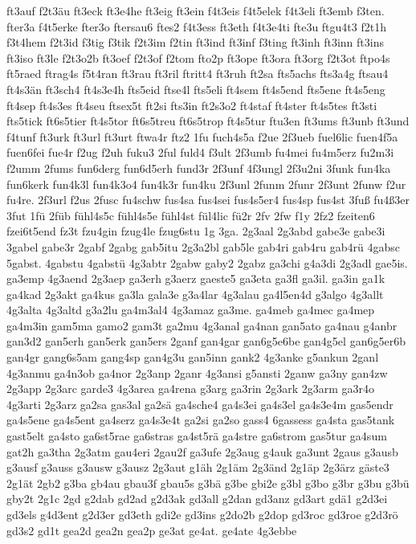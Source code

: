 {ft3auf
f2t3äu
ft3eck
ft3e4he
ft3eig
ft3ein
f4t3eis
f4t5elek
f4t3eli
ft3emb
f3ten.
fter3a
f4t5erke
fter3o
ftersau6
ftes2
f4t3ess
ft3eth
f4t3e4ti
fte3u
ftgu4t3
f2t1h
f3t4hem
f2t3id
f3tig
f3tik
f2t3im
f2tin
ft3ind
ft3inf
f3ting
ft3inh
ft3inn
ft3ins
ft3iso
ft3le
f2t3o2b
ft3oef
f2t3of
f2tom
fto2p
ft3ope
ft3ora
ft3org
f2t3ot
ftpo4s
ft5raed
ftrag4s
f5t4ran
ft3rau
ft3ril
ftritt4
ft3ruh
ft2sa
fts5achs
fts3a4g
ftsau4
ft4s3än
ft3sch4
ft4s3e4h
fts5eid
ftse4l
fts5eli
ft4sem
ft4s5end
fts5ene
ft4s5eng
ft4sep
ft4s3es
ft4seu
ftsex5t
ft2si
fts3in
ft2s3o2
ft4staf
ft4ster
ft4s5tes
ft3sti
fts5tick
ft6s5tier
ft4s5tor
ft6s5treu
ft6s5trop
ft4s5tur
ftu3en
ft3ums
ft3unb
ft3und
f4tunf
ft3urk
ft3url
ft3urt
ftwa4r
ftz2
1fu
fuch4s5a
f2ue
2f3ueb
fuel6lic
fuen4f5a
fuen6fei
fue4r
f2ug
f2uh
fuku3
2ful
fuld4
f3ult
2f3umb
fu4mei
fu4m5erz
fu2m3i
f2umm
2fums
fun6derg
fun6d5erh
fund3r
2f3unf
4f3ungl
2f3u2ni
3funk
fun4ka
fun6kerk
fun4k3l
fun4k3o4
fun4k3r
fun4ku
2f3unl
2funm
2funr
2f3unt
2funw
f2ur
fu4re.
2f3url
f2us
2fusc
fu4schw
fus4sa
fus4sei
fus4s5er4
fus4sp
fus4st
3fuß
fu4ß3er
3fut
1fü
2füb
fühl4s5c
fühl4s5e
fühl4st
fül4lic
fü2r
2fv
2fw
f1y
2fz2
fzeiten6
fzei6t5end
fz3t
fzu4gin
fzug4le
fzug6stu
1g
3ga.
2g3aal
2g3abd
gabe3e
gabe3i
3gabel
gabe3r
2gabf
2gabg
gab5itu
2g3a2bl
gab5le
gab4ri
gab4ru
gab4rü
4gabsc
5gabst.
4gabstu
4gabstü
4g3abtr
2gabw
gaby2
2gabz
ga3chi
g4a3di
2g3adl
gae5is.
ga3emp
4g3aend
2g3aep
ga3erh
g3aerz
gaeste5
ga3eta
ga3fl
ga3il.
ga3in
ga1k
ga4kad
2g3akt
ga4kus
ga3la
gala3e
g3a4lar
4g3alau
ga4l5en4d
g3algo
4g3allt
4g3alta
4g3altd
g3a2lu
ga4m3al4
4g3amaz
ga3me.
ga4meb
ga4mec
ga4mep
ga4m3in
gam5ma
gamo2
gam3t
ga2mu
4g3anal
ga4nan
gan5ato
ga4nau
g4anbr
gan3d2
gan5erh
gan5erk
gan5ers
2ganf
gan4gar
gan6g5e6be
gan4g5el
gan6g5er6b
gan4gr
gang6s5am
gang4sp
gan4g3u
gan5inn
gank2
4g3anke
g5ankun
2ganl
4g3anmu
ga4n3ob
ga4nor
2g3anp
2ganr
4g3ansi
g5ansti
2ganw
ga3ny
gan4zw
2g3app
2g3arc
garde3
4g3area
ga4rena
g3arg
ga3rin
2g3ark
2g3arm
ga3r4o
4g3arti
2g3arz
ga2sa
gas3al
ga2sä
ga4sche4
ga4s3ei
ga4s3el
ga4s3e4m
gas5endr
ga4s5ene
ga4s5ent
ga4serz
ga4s3e4t
ga2si
ga2so
gass4
6gassess
ga4sta
gas5tank
gast5elt
ga4sto
ga6st5rae
ga6stras
ga4st5rä
ga4stre
ga6strom
gas5tur
ga4sum
gat2h
ga3tha
2g3atm
gau4eri
2gau2f
ga3ufe
2g3aug
g4auk
ga3unt
2gaus
g3ausb
g3ausf
g3auss
g3ausw
g3ausz
2g3aut
g1äh
2g1äm
2g3änd
2g1äp
2g3ärz
gäste3
2g1ät
2gb2
g3ba
gb4au
gbau3f
gbau5s
g3bä
g3be
gbi2e
g3bl
g3bo
g3br
g3bu
g3bü
gby2t
2g1c
2gd
g2dab
gd2ad
g2d3ak
gd3all
g2dan
gd3anz
gd3art
gdä1
g2d3ei
gd3els
g4d3ent
g2d3er
gd3eth
gdi2e
gd3ins
g2do2b
g2dop
gd3roc
gd3roe
g2d3rö
gd3s2
gd1t
gea2d
gea2n
gea2p
ge3at
ge4at.
ge4ate
4g3ebbe
}
